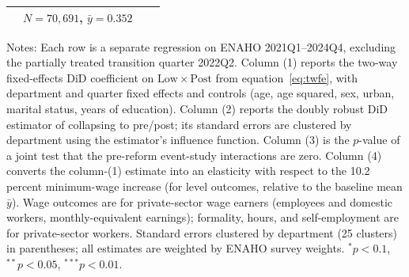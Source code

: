\begin{table}[!tbp]
\begin{threeparttable}
\begin{tabular}{lcccc}
 & \multicolumn{2}{c}{\footnotesize $N=70,691$, $\bar{y}=0.352$} & & \\
\bottomrule
\end{tabular}
\begin{tablenotes}\footnotesize
\item Notes: Each row is a separate regression on ENAHO 2021Q1--2024Q4, excluding the partially treated transition quarter 2022Q2. Column (1) reports the two-way fixed-effects DiD coefficient on $\mathrm{Low}\times\mathrm{Post}$ from equation~\eqref{eq:twfe}, with department and quarter fixed effects and controls (age, age squared, sex, urban, marital status, years of education). Column (2) reports the doubly robust DiD estimator of \citet{santanna_zhao_2020} collapsing to pre/post; its standard errors are clustered by department using the estimator's influence function. Column (3) is the $p$-value of a joint test that the pre-reform event-study interactions are zero. Column (4) converts the column-(1) estimate into an elasticity with respect to the 10.2 percent minimum-wage increase (for level outcomes, relative to the baseline mean $\bar{y}$). Wage outcomes are for private-sector wage earners (employees and domestic workers, monthly-equivalent earnings); formality, hours, and self-employment are for private-sector workers. Standard errors clustered by department (25 clusters) in parentheses; all estimates are weighted by ENAHO survey weights. $^{*}p<0.1$, $^{**}p<0.05$, $^{***}p<0.01$.
\end{tablenotes}
\end{threeparttable}\end{table}
